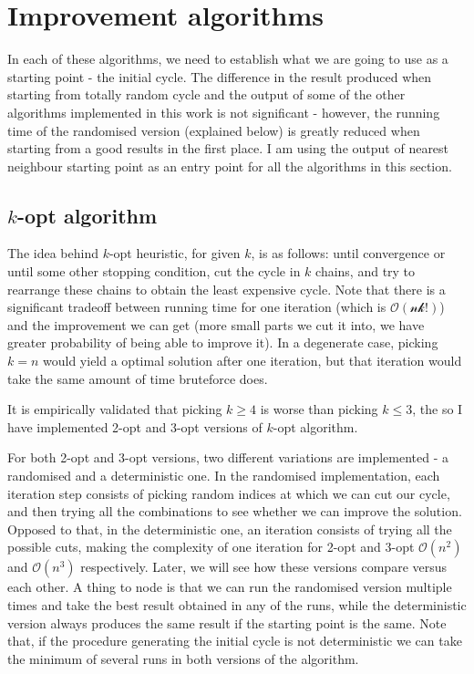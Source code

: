 \documentclass[12pt,twoside,notitlepage]{report}
\begin{document}
\section{Improvement algorithms}

In each of these algorithms, we need to establish what we are going to use as a starting point - the initial cycle. The difference in the result produced when starting from totally random cycle and the output of some of the other algorithms implemented in this work is not significant - however, the running time of the randomised version (explained below) is greatly reduced when starting from a good results in the first place. I am using the output of nearest neighbour starting point as an entry point for all the algorithms in this section.

\subsection{$k$-opt algorithm}

The idea behind $k$-opt heuristic, for given $k$, is as follows: until convergence or until some other stopping condition, cut the cycle in $k$ chains, and try to rearrange these chains to obtain the least expensive cycle. Note that there is a significant tradeoff between running time for one iteration (which is $\mathcal{O(nk!)}$) and the improvement we can get (more small parts we cut it into, we have greater probability of being able to improve it). In a degenerate case, picking $k = n$ would yield a optimal solution after one iteration, but that iteration would take the same amount of time bruteforce does. 

\smallskip

It is empirically validated that picking $k \geq 4$ is worse than picking $k \leq 3$, the so I have implemented 2-opt and 3-opt versions of $k$-opt algorithm.

For both 2-opt and 3-opt versions, two different variations are implemented - a randomised and a deterministic one. In the randomised implementation, each iteration step consists of picking random indices at which we can cut our cycle, and then trying all the combinations to see whether we can improve the solution. Opposed to that, in the deterministic one, an iteration consists of trying all the possible cuts, making the complexity of one iteration for 2-opt and 3-opt $\mathcal{O}(n^2)$ and $\mathcal{O}(n^3)$ respectively. Later, we will see how these versions compare versus each other. A thing to node is that we can run the randomised version multiple times and take the best result obtained in any of the runs, while the deterministic version always produces the same result if the starting point is the same. Note that, if the procedure generating the initial cycle is not deterministic we can take the minimum of several runs in both versions of the algorithm.
\end{document}

